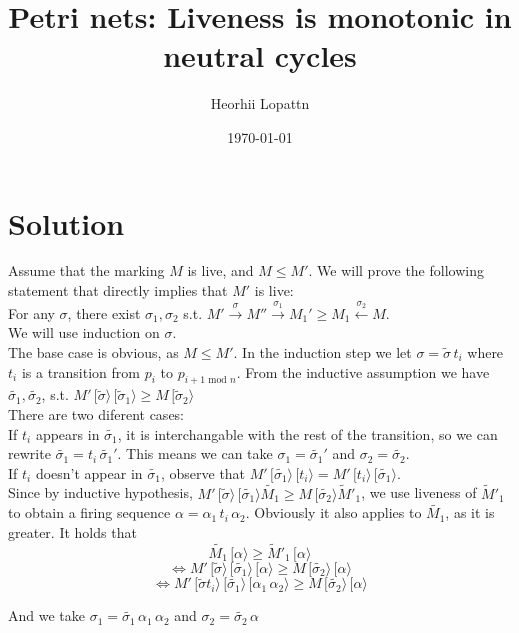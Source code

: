 \documentclass[12pt]{article}
\title{Petri nets: Liveness is monotonic in neutral cycles}
\author{Heorhii Lopattn}
\date{\today}
\begin{document}
\newcommand{\fire}[1]{\xrightarrow{#1}}
\newcommand{\fireb}[1]{\xleftarrow{#1}}

\newcommand{\firee}[1]{\,[#1\rangle}

\maketitle

\section*{Solution}
Assume that the marking $M$ is live, and $M \le M'$. 
We will prove the following statement that directly implies that $M'$ is live: \\
For any $\sigma$, there exist $\sigma_1, \sigma_2$ s.t. $M' \fire \sigma M'' \fire {\sigma_1} M_1' \ge M_1 \fireb {\sigma_2} M$. \\
We will use induction on $\sigma$. \\
The base case is obvious, as $M \le M'$.
In the induction step we let $\sigma = \tilde \sigma\, t_i$ where $t_i$ is a transition from $p_i$ to $p_{i+1 \text{ mod } n}$. 
From the inductive assumption we have $\tilde {\sigma_1}, \tilde {\sigma_2}$, s.t. $M' \firee {\tilde \sigma} \firee {\tilde \sigma_1} \ge M \firee {\tilde \sigma_2}$ \\
There are two diferent cases: \\
If $t_i$ appears in $\tilde {\sigma_1}$, it is interchangable with the rest of the transition, so we can rewrite  $\tilde {\sigma_1} = t_i \, \tilde {\sigma_1}'$. This means we can take $\sigma_1 = \tilde {\sigma_1}'$ and $\sigma_2 = \tilde {\sigma_2}$.\\
If $t_i$ doesn't appear in $\tilde {\sigma_1}$, observe that $M'\firee{\tilde{\sigma_1}}\firee {t_i} = M'\firee {t_i}\firee{\tilde{\sigma_1}}$. \\
Since by inductive hypothesis, $M'\firee {\tilde \sigma } \firee {\tilde {\sigma_1}} \tilde {M_1} \ge M \firee {\tilde {\sigma_2}} \tilde {M}'_1$, we use liveness of $\tilde M'_1$ to obtain a firing sequence $\alpha = \alpha_1\, t_i\, \alpha_2$. Obviously it also applies to $\tilde {M_1}$, as it is greater. It holds that 
$$\tilde {M_1} \firee \alpha \ge \tilde M'_1 \firee \alpha$$
$$\iff M'\firee {\tilde \sigma } \firee {\tilde {\sigma_1}} \firee \alpha \ge M \firee {\tilde {\sigma_2}} \firee \alpha$$
$$\iff M'\firee {\tilde \sigma t_i} \firee {\tilde {\sigma_1}} \firee {\alpha_1 \, \alpha_2} \ge M \firee {\tilde {\sigma_2}} \firee \alpha$$

And we take $\sigma_1 = \tilde {\sigma_1} \, \alpha_1 \, \alpha_2$ and $\sigma_2 = \tilde {\sigma_2}\, \alpha$
\end{document}
